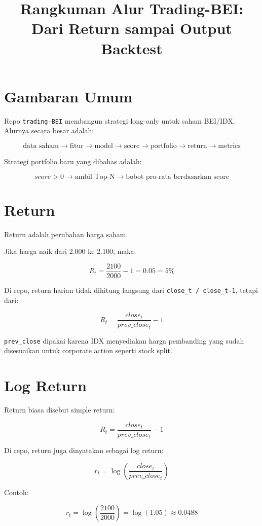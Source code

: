 \documentclass[11pt,a4paper]{article}
\title{Rangkuman Alur Trading-BEI: Dari Return sampai Output Backtest}
\author{}
\date{}
\begin{document}
\maketitle

\section*{Gambaran Umum}

Repo \texttt{trading-BEI} membangun strategi long-only untuk saham BEI/IDX.
Alurnya secara besar adalah:

\[
\text{data saham}
\rightarrow
\text{fitur}
\rightarrow
\text{model}
\rightarrow
\text{score}
\rightarrow
\text{portfolio}
\rightarrow
\text{return}
\rightarrow
\text{metrics}
\]

Strategi portfolio baru yang dibahas adalah:

\[
\boxed{
score > 0
\rightarrow
\text{ambil Top-N}
\rightarrow
\text{bobot pro-rata berdasarkan score}
}
\]

\section{Return}

Return adalah perubahan harga saham.

Jika harga naik dari 2.000 ke 2.100, maka:

\[
R_t = \frac{2100}{2000} - 1 = 0.05 = 5\%
\]

Di repo, return harian tidak dihitung langsung dari \texttt{close\_t / close\_{t-1}},
tetapi dari:

\[
\boxed{
R_t = \frac{close_t}{prev\_close_t} - 1
}
\]

\texttt{prev\_close} dipakai karena IDX menyediakan harga pembanding yang sudah
disesuaikan untuk corporate action seperti stock split.

\section{Log Return}

Return biasa disebut simple return:

\[
R_t = \frac{close_t}{prev\_close_t} - 1
\]

Di repo, return juga dinyatakan sebagai log return:

\[
\boxed{
r_t = \log\left(\frac{close_t}{prev\_close_t}\right)
}
\]

Contoh:

\[
r_t = \log\left(\frac{2100}{2000}\right)
= \log(1.05)
\approx 0.0488
\]
\end{document}
